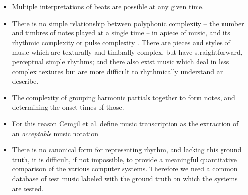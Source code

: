 \documentclass{scrartcl}
\begin{document}
\begin{itemize}
\item Multiple interpretations of beats are possible at any given time.
\item There is no simple relationship between polyphonic complexity -- the number and timbres of notes played at a single time -- in apiece of music, and its rhythmic complexity or pulse complexity \cite{Scheirer1998}. There are pieces and styles of music which are texturally and timbrally complex, but have straightforward, perceptual simple rhythms; and there also exist music which deal in less complex textures but are more difficult to rhythmically understand an describe.
\item The complexity of grouping harmonic partials together to form notes, and determining the onset times of those.
\item For this reason Cemgil et al. \cite{Cemgil2001} define music transcription as the extraction of an \emph{acceptable} music notation.
\item There is no canonical form for representing rhythm, and lacking this ground truth, it is difficult, if not impossible, to provide a meaningful quantitative comparison of the various computer systems. Therefore we need a common database of test music labeled with the ground truth on which the systems are tested. 
\end{itemize}



\end{document}
